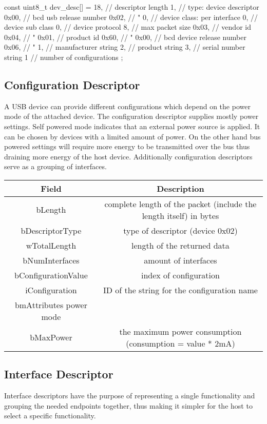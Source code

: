 \begin{verbatim*}
 const uint8_t dev_desc[] = {
	18,     // descriptor length
	1,      // type: device descriptor
	0x00,   // bcd usb release number
	0x02,   //  "
	0,      // device class: per interface
	0,      // device sub class
	0,      // device protocol
	8,     // max packet size
	0x03,   // vendor id
	0x04,   //  "
	0x01,   // product id
	0x60,   //  "
	0x00,   // bcd device release number
	0x06,   //  "
	1,      // manufacturer string
	2,      // product string
	3,      // serial number string
	1       // number of configurations
};
\end{verbatim*}
\subsection{Configuration Descriptor}
A USB device can provide different configurations which depend on the power mode of the attached device. The configuration descriptor supplies mostly 
power settings. Self powered mode indicates that an external power source is applied. It can be chosen by devices with a limited amount of power. On 
the other hand bus powered settings will require more energy to be transmitted over the bus thus draining more energy of the host device. Additionally 
configuration descriptors serve as a grouping of interfaces.

\begin{tabular}{c|c}
Field & Description \\ \hline
bLength & complete length of the packet (include the length itself) in bytes \\
bDescriptorType & type of descriptor (device 0x02)\\
wTotalLength & length of the returned data \\
bNumInterfaces & amount of interfaces\\
bConfigurationValue & index of configuration \\
iConfiguration & ID of the string for the configuration name\\
bmAttributes  power mode\\
bMaxPower & the maximum power consumption (consumption = value * 2mA) \\
\end{tabular}

\subsection{Interface Descriptor}
Interface descriptors have the purpose of representing a single functionality and grouping the needed endpoints together, thus making it simpler for 
the host to select a specific functionality.

